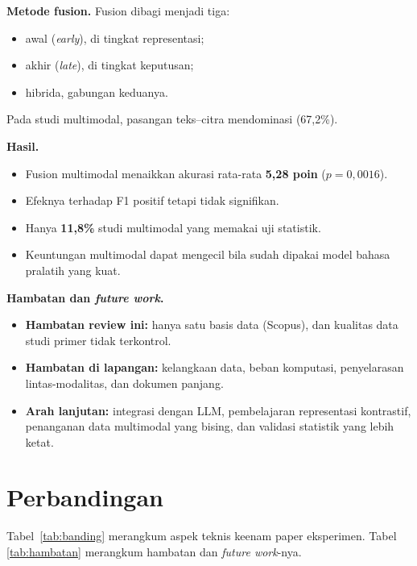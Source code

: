 \textbf{Metode fusion.} Fusion dibagi menjadi tiga:
\begin{itemize}
  \item awal (\textit{early}), di tingkat representasi;
  \item akhir (\textit{late}), di tingkat keputusan;
  \item hibrida, gabungan keduanya.
\end{itemize}
Pada studi multimodal, pasangan teks--citra mendominasi (67,2\%).

\textbf{Hasil.}
\begin{itemize}
  \item Fusion multimodal menaikkan akurasi rata-rata \textbf{5,28 poin} ($p = 0{,}0016$).
  \item Efeknya terhadap F1 positif tetapi tidak signifikan.
  \item Hanya \textbf{11,8\%} studi multimodal yang memakai uji statistik.
  \item Keuntungan multimodal dapat mengecil bila sudah dipakai model bahasa pralatih yang
  kuat.
\end{itemize}

\textbf{Hambatan dan \textit{future work}.}
\begin{itemize}
  \item \textbf{Hambatan review ini:} hanya satu basis data (Scopus), dan kualitas data
  studi primer tidak terkontrol.
  \item \textbf{Hambatan di lapangan:} kelangkaan data, beban komputasi, penyelarasan
  lintas-modalitas, dan dokumen panjang.
  \item \textbf{Arah lanjutan:} integrasi dengan LLM, pembelajaran representasi
  kontrastif, penanganan data multimodal yang bising, dan validasi statistik yang lebih
  ketat.
\end{itemize}

\section{Perbandingan}\label{sec:perbandingan}

Tabel~\ref{tab:banding} merangkum aspek teknis keenam paper eksperimen. Tabel
\ref{tab:hambatan} merangkum hambatan dan \textit{future work}-nya.

